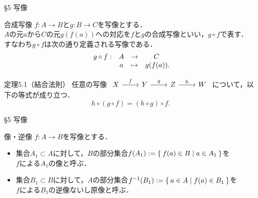 \documentclass[uplatex,a4paper,dvipdfmx,aspectratio=169,11pt]{beamer}
\begin{document}
\begin{frame}[fragile]{\S 5 写像}
    \begin{block}{合成写像}
        $f \colon A \to B$と$g \colon B \to C$を写像とする． \\
        $A$の元$a$から$C$の元$g(f(a))$への対応を$f$と$g$の\alert{合成写像}といい，$g \circ f$で表す．\\
        すなわち$g \circ f$は次の通り定義される写像である．
        \begin{equation*}
            \begin{array}{rccc}
                g \circ f :& A & \to & C \\
                           & a & \mapsto & g(f(a))\rlap{.}
            \end{array}
        \end{equation*}
    \end{block}
    \medskip

    \begin{block}{定理5.1（結合法則）}
        任意の写像 $\begin{tikzcd} X \arrow[r, "f"] & Y \arrow[r, "g"] & Z \arrow[r, "h"] & W \end{tikzcd}$ について，以下の等式が成り立つ．
        \begin{equation*}
            h \circ (g \circ f) = (h \circ g) \circ f.
        \end{equation*}
    \end{block}

\end{frame}

\begin{frame}[fragile]{\S 5 写像}
    \begin{block}{像・逆像}
        $f \colon A \to B$を写像とする．
        \begin{itemize}
            \item 集合$A_1 \subset A$に対して，$B$の部分集合$f(A_1) := \Set{ f(a) \in B | a \in A_1}$を\\$f$による$A_1$の\alert{像}と呼ぶ．
            \item 集合$B_1 \subset B$に対して，$A$の部分集合$f^{-1}(B_1) := \Set{ a \in A | f(a) \in B_1}$を\\$f$による$B_1$の\alert{逆像}ないし\alert{原像}と呼ぶ．
        \end{itemize}
    \end{block}
    \medskip

    

\end{frame}
\end{document}
